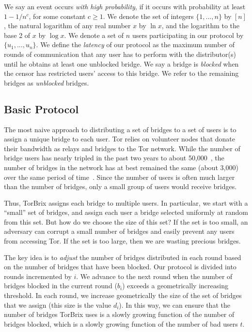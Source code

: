 \documentclass[letterpaper,twocolumn,10pt]{article}
\newcommand{\fullpaper}[1]{#1}
\newcommand{\fullpaper}[1]{}
\newcommand{\sfsize}{\fontsize{0.73\baselineskip}{0.73\baselineskip}\selectfont}
\newcommand{\sans}[1]{\textsf{\sfsize \mbox{#1}}}
\newcommand{\brix}{\sans{TorBrix}\xspace}
\begin{document}
We say an event occurs \emph{with high probability}, if it occurs with probability at least \emph{${1-1/n^c}$}, for some constant ${c \geq 1}$. We denote the set of integers ${\{1,...,n\}}$ by $[n]$, the natural logarithm of any real number $x$ by $\ln{x}$, and the logarithm to the base 2 of $x$ by $\log{x}$. We denote a set of $n$ users participating in our protocol by ${\{u_1,...,u_n\}}$. We define the \emph{latency} of our protocol as the maximum number of rounds of communication that any user has to perform with the distributor(s) until he obtains at least one unblocked bridge. \fullpaper{We say a bridge is \emph{blocked} when the censor has restricted users' access to this bridge. We refer to the remaining bridges as \emph{unblocked} bridges.}

\subsection{Basic Protocol} \label{sec:basic-alg}
The most naive approach to distributing a set of bridges to a set of users is to assign a unique bridge to each user. Tor relies on volunteer nodes that donate their bandwidth as relays and bridges to the Tor network. While the number of bridge users has nearly tripled in the past two years to about 50,000~\cite{Tor:BridgeUsers}, the number of bridges in the network has at best remained the same (about 3,000) over the same period of time~\cite{Tor:Bridges}. Since the number of users is often much larger than the number of bridges, only a small group of users would receive bridges.

Thus, \brix assigns each bridge to multiple users.  In particular, we start with a ``small'' set of bridges, and assign each user a bridge selected uniformly at random from this set.  But how do we choose the size of this set?  If the set is too small, an adversary can corrupt a small number of bridges and easily prevent any users from accessing Tor.  If the set is too large, then we are wasting precious bridges.

The key idea is to \emph{adjust} the number of bridges distributed in each round based on the number of bridges that have been blocked.  Our protocol is divided into rounds incremented by $i$.  We advance to the next round when the number of bridges blocked in the current round ($b_i$) exceeds a geometrically increasing threshold.  In each round, we increase geometrically the size of the set of bridges that we assign (this size is the value $d_i$).  In this way, we can ensure that the number of bridges \brix uses is a slowly growing function of the number of bridges blocked, which is a slowly growing function of the number of bad users $t$.
\end{document}
